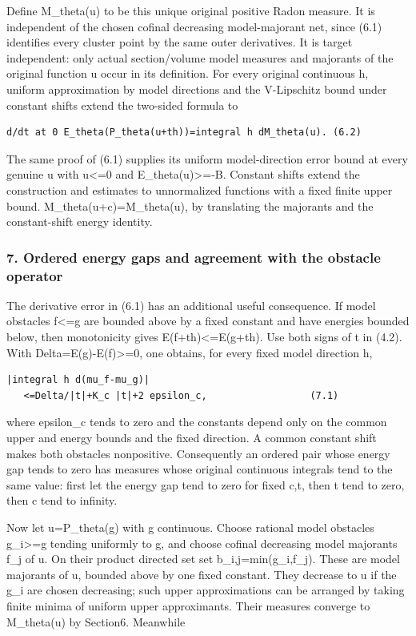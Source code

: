 \documentclass[
  10pt,
]{article}
\begin{document}
Define M\_theta(u) to be this unique original positive Radon measure. It
is independent of the chosen cofinal decreasing model-majorant net,
since (6.1) identifies every cluster point by the same outer
derivatives. It is target independent: only actual section/volume model
measures and majorants of the original function u occur in its
definition. For every original continuous h, uniform approximation by
model directions and the V-Lipschitz bound under constant shifts extend
the two-sided formula to

\begin{verbatim}
d/dt at 0 E_theta(P_theta(u+th))=integral h dM_theta(u). (6.2)
\end{verbatim}

The same proof of (6.1) supplies its uniform model-direction error bound
at every genuine u with u\textless=0 and E\_theta(u)\textgreater=-B.
Constant shifts extend the construction and estimates to unnormalized
functions with a fixed finite upper bound. M\_theta(u+c)=M\_theta(u), by
translating the majorants and the constant-shift energy identity.

\subsubsection{7. Ordered energy gaps and agreement with the obstacle
operator}\label{ordered-energy-gaps-and-agreement-with-the-obstacle-operator}

The derivative error in (6.1) has an additional useful consequence. If
model obstacles f\textless=g are bounded above by a fixed constant and
have energies bounded below, then monotonicity gives
E(f+th)\textless=E(g+th). Use both signs of t in (4.2). With
Delta=E(g)-E(f)\textgreater=0, one obtains, for every fixed model
direction h,

\begin{verbatim}
|integral h d(mu_f-mu_g)|
   <=Delta/|t|+K_c |t|+2 epsilon_c,                  (7.1)
\end{verbatim}

where epsilon\_c tends to zero and the constants depend only on the
common upper and energy bounds and the fixed direction. A common
constant shift makes both obstacles nonpositive. Consequently an ordered
pair whose energy gap tends to zero has measures whose original
continuous integrals tend to the same value: first let the energy gap
tend to zero for fixed c,t, then t tend to zero, then c tend to
infinity.

Now let u=P\_theta(g) with g continuous. Choose rational model obstacles
g\_i\textgreater=g tending uniformly to g, and choose cofinal decreasing
model majorants f\_j of u. On their product directed set set
b\_i,j=min(g\_i,f\_j). These are model majorants of u, bounded above by
one fixed constant. They decrease to u if the g\_i are chosen
decreasing; such upper approximations can be arranged by taking finite
minima of uniform upper approximants. Their measures converge to
M\_theta(u) by Section6. Meanwhile
\end{document}
